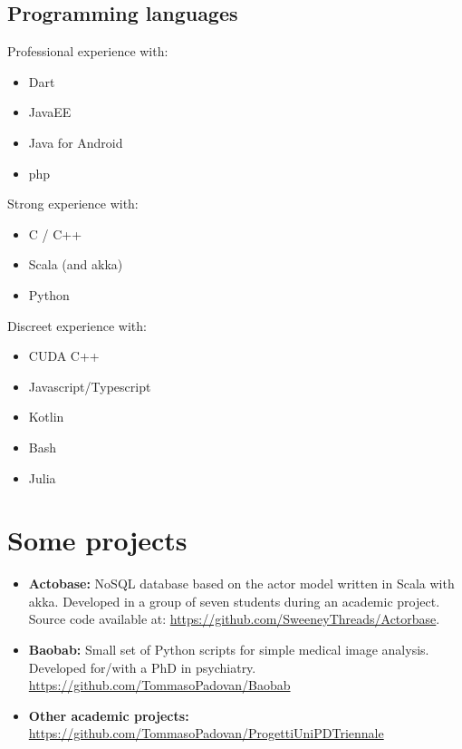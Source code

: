 \documentclass[letterpaper]{twentysecondcv} %
\begin{document}
\newpage %

\normalsize
\makeprofileEmpy %

\subsection{Programming languages}
\begin{minipage}[t]{0.33\linewidth}
	\small
	Professional experience with:
	\begin{itemize}[noitemsep]
		\item Dart
		\item JavaEE
		\item Java for Android
		\item php
	\end{itemize}
\end{minipage}
\begin{minipage}[t]{0.33\linewidth}
	\small
	Strong experience with:
	\begin{itemize}[noitemsep]
		\item C / C++
		\item Scala (and akka)
		\item Python
	\end{itemize}
\end{minipage}
\begin{minipage}[t]{0.33\linewidth}
	\small
	Discreet experience with:
	\begin{itemize}[noitemsep,nolistsep]
		\item CUDA C++
		\item Javascript/Typescript
		\item Kotlin
		\item Bash
		\item Julia
	\end{itemize}
\end{minipage}





\section{Some projects}
\small
\begin{itemize}[noitemsep,nolistsep]
	\item \textbf{Actobase:} NoSQL database based on the actor model written in Scala with akka. Developed in a group of seven students during an academic project. Source code available at: \url{https://github.com/SweeneyThreads/Actorbase}.
	\item \textbf{Baobab:} Small set of Python scripts for simple medical image analysis. Developed for/with a PhD in psychiatry. \url{https://github.com/TommasoPadovan/Baobab}
	\item \textbf{Other academic projects:} \\\url{https://github.com/TommasoPadovan/ProgettiUniPDTriennale}
\end{itemize}
\end{document}
